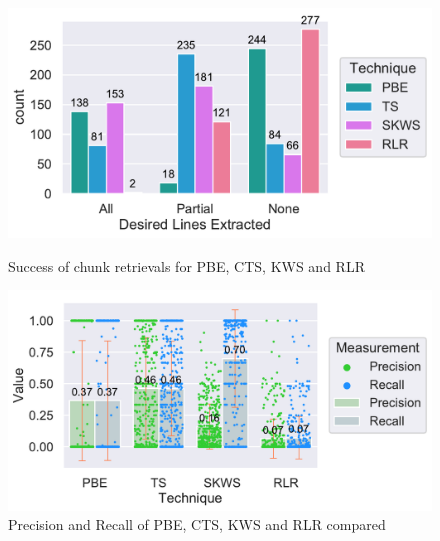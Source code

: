 \documentclass[\myrootdir/main.tex]{subfiles}
\begin{document}
\begin{figure}[htbp]
	\centering
	\begin{minipage}{0.45\textwidth}
		\centering
		\includegraphics[width=\textwidth, clip]{img/big-study/success-partial-all.pdf}
		\caption{Success of chunk retrievals for PBE, CTS, KWS and RLR}
		\label{fig:success-partial-all}
	\end{minipage}\hfill
	\begin{minipage}{0.45\textwidth}
		\centering
		\includegraphics[width=\textwidth, clip]{img/big-study/recall-precision-all.pdf}
		\caption{Precision and Recall of PBE, CTS, KWS and RLR compared}
		\label{fig:recall-precision-all}
	\end{minipage}
\end{figure}
\end{document}
